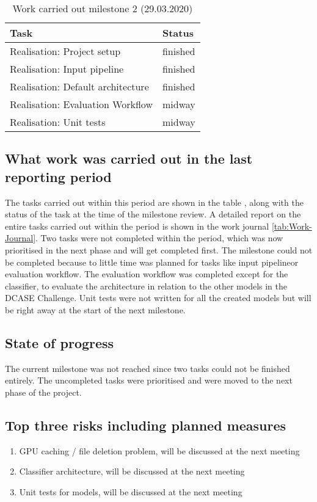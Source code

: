 \begin{table}[htbp]
    \centering
    \caption{Work carried out milestone 2 (29.03.2020)}
	\label{tab:Work-Carried-Out-M2}
    \begin{tabular}{p{} | p{}}
        \toprule
        \textbf{Task} & \textbf{Status} \\ 
        \midrule[1pt]
        Realisation: Project setup & finished \\
        \hline
        Realisation: Input pipeline & finished \\
        \hline
        Realisation: Default architecture & finished \\
        \hline
        Realisation: Evaluation Workflow & midway \\
        \hline
        Realisation: Unit tests & midway \\
        \bottomrule
    \end{tabular}
\end{table}

\subsection{What work was carried out in the last reporting period}
The tasks carried out within this period are shown in the table , along with the status of the task at the time of the milestone review. A detailed report on the entire tasks carried out within the period is shown in the work journal \ref{tab:Work-Journal}. Two tasks were not completed within the period, which was now prioritised in the next phase and will get completed first. The milestone could not be completed because to little time was planned for tasks like \flqq input pipeline\frqq or \flqq evaluation workflow\frqq. The evaluation workflow was completed except for the classifier, to evaluate the architecture in relation to the other models in the DCASE Challenge. Unit tests were not written for all the created models but will be right away at the start of the next milestone.

\subsection{State of progress}
The current milestone was not reached since two tasks could not be finished entirely. The uncompleted tasks were prioritised and were moved to the next phase of the project.

\subsection{Top three risks including planned measures}
\begin{enumerate}
    \setlength\itemsep{0em}
    \item GPU caching / file deletion problem, will be discussed at the next meeting
    \item Classifier architecture, will be discussed at the next meeting
    \item Unit tests for models, will be discussed at the next meeting 
\end{enumerate}

